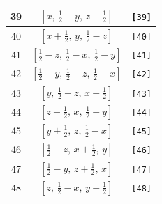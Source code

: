 \documentclass[fleqn,8pt]{jsarticle}
\begin{document}
\begin{longtable}{ccc}
39 & $\left[ x,\, \frac{1}{2} - y,\, z + \frac{1}{2} \right]$ & {\tt [39]} \\ \hline
40 & $\left[ x + \frac{1}{2},\, y,\, \frac{1}{2} - z \right]$ & {\tt [40]} \\ \hline
41 & $\left[ \frac{1}{2} - z,\, \frac{1}{2} - x,\, \frac{1}{2} - y \right]$ & {\tt [41]} \\ \hline
42 & $\left[ \frac{1}{2} - y,\, \frac{1}{2} - z,\, \frac{1}{2} - x \right]$ & {\tt [42]} \\ \hline
43 & $\left[ y,\, \frac{1}{2} - z,\, x + \frac{1}{2} \right]$ & {\tt [43]} \\ \hline
44 & $\left[ z + \frac{1}{2},\, x,\, \frac{1}{2} - y \right]$ & {\tt [44]} \\ \hline
45 & $\left[ y + \frac{1}{2},\, z,\, \frac{1}{2} - x \right]$ & {\tt [45]} \\ \hline
46 & $\left[ \frac{1}{2} - z,\, x + \frac{1}{2},\, y \right]$ & {\tt [46]} \\ \hline
47 & $\left[ \frac{1}{2} - y,\, z + \frac{1}{2},\, x \right]$ & {\tt [47]} \\ \hline
48 & $\left[ z,\, \frac{1}{2} - x,\, y + \frac{1}{2} \right]$ & {\tt [48]} \\
\end{longtable}
\end{document}
